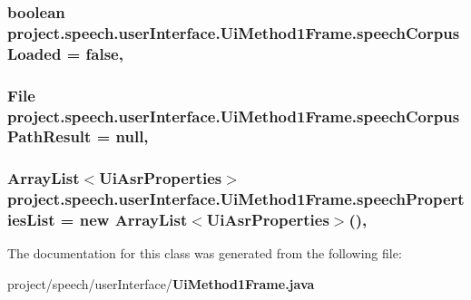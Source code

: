 \subsubsection[{speech\+Corpus\+Loaded}]{\setlength{\rightskip}{0pt plus 5cm}boolean project.\+speech.\+user\+Interface.\+Ui\+Method1\+Frame.\+speech\+Corpus\+Loaded = false\hspace{0.3cm}{\ttfamily [static]}, {\ttfamily [private]}}\label{classproject_1_1speech_1_1user_interface_1_1_ui_method1_frame_a7a4b6e36b7a55255f56ae0ff2a173241}
\subsubsection[{speech\+Corpus\+Path\+Result}]{\setlength{\rightskip}{0pt plus 5cm}File project.\+speech.\+user\+Interface.\+Ui\+Method1\+Frame.\+speech\+Corpus\+Path\+Result = null\hspace{0.3cm}{\ttfamily [static]}, {\ttfamily [private]}}\label{classproject_1_1speech_1_1user_interface_1_1_ui_method1_frame_a67d435afdbd332b9d62c8229f814ab68}
\subsubsection[{speech\+Properties\+List}]{\setlength{\rightskip}{0pt plus 5cm}Array\+List$<${\bf Ui\+Asr\+Properties}$>$ project.\+speech.\+user\+Interface.\+Ui\+Method1\+Frame.\+speech\+Properties\+List = new Array\+List$<${\bf Ui\+Asr\+Properties}$>$()\hspace{0.3cm}{\ttfamily [static]}, {\ttfamily [private]}}\label{classproject_1_1speech_1_1user_interface_1_1_ui_method1_frame_a73ea7e20e55c124b4d6af8b977aedb6e}


The documentation for this class was generated from the following file\+:\begin{DoxyCompactItemize}
\item 
project/speech/user\+Interface/{\bf Ui\+Method1\+Frame.\+java}\end{DoxyCompactItemize}
